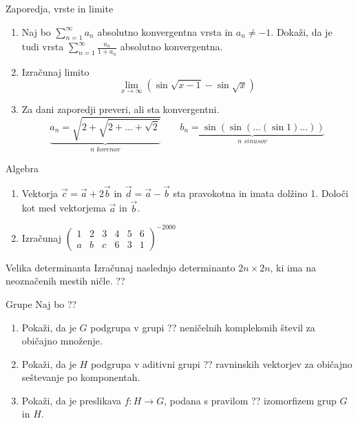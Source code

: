 \newcommand{\ZZ}{\mathbb{Z}}
\newcommand{\RR}{\mathbb{R}}
\newcommand{\CC}{\mathbb{C}}
\begin{frame}{Zaporedja, vrste in limite}
	\begin{enumerate}
		\item 
		Naj bo $\sum_{n=1}^{\infty} a_n$ absolutno konvergentna vrsta in $a_n \ne -1$.
		Dokaži, da je tudi vrsta $\sum_{n=1}^\infty \frac{a_n}{1+a_n}$
		absolutno konvergentna.

		\item
		Izračunaj limito
		\[ \lim_{x\to\infty} (\sin\sqrt{x-1}-\sin\sqrt{x}) \]

		\item
		Za dani zaporedji preveri, ali sta konvergentni.
		$$
		\underbrace{a_n = \sqrt{2+\sqrt{2+\dots+\sqrt{2}}}}_{\textit{n korenov}} \qquad \underbrace{b_n = \sin(\sin(\dots(\sin 1)\dots)) }_{\textit{n sinusov}}
		$$
	\end{enumerate}
\end{frame}

\begin{frame}{Algebra}
	\begin{enumerate}
		\item
		Vektorja $\vec{c} = \vec{a} + 2\vec{b}$ in $\vec{d} = \vec{a} - \vec{b}$
		sta pravokotna in imata dolžino 1. Določi kot med vektorjema $\vec{a}$ in $\vec{b}$.
		\item 
		Izračunaj
		\(
        \begin{pmatrix}
			1 & 2 & 3 & 4 & 5 & 6\\
			a & b & c & 6 & 3 & 1
			\end{pmatrix}^{-2000}\)
		
	\end{enumerate}
\end{frame}

\begin{frame}{Velika determinanta}
	Izračunaj naslednjo determinanto $2n \times 2n$, ki ima na neoznačenih mestih ničle.
	??
\end{frame}

\begin{frame}{Grupe}
	Naj bo
	??
	\begin{enumerate}
		\item
			Pokaži, da je $G$ podgrupa v grupi ??
			neničelnih kompleksnih števil za običajno množenje.
		\item
			Pokaži, da je $H$ podgrupa v aditivni grupi ??
			ravninskih vektorjev za običajno seštevanje po komponentah.
		\item
			Pokaži, da je preslikava $f:H\to G$, podana s pravilom
			??
			izomorfizem grup $G$ in $H$.
	\end{enumerate}
\end{frame}
